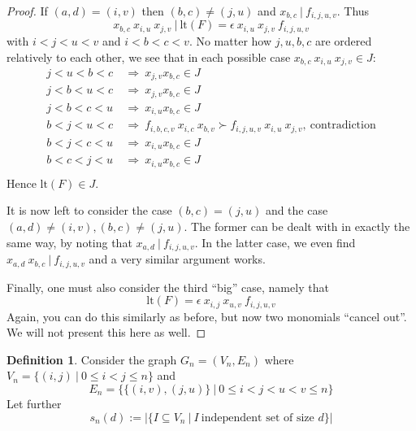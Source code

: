 \documentclass{scrartcl}
\newcommand{\contradiction}{\text{contradiction}}
\newcommand{\divides}{\ | \ }
\theoremstyle{definition}
\newtheorem{definition}[subsection]{Definition}
\begin{document}
\begin{proof}
    If $(a, d) = (i, v)$ then $(b, c) \neq (j, u)$ and $x_{b, c} \divides f_{i, j, u, v}$.
    Thus
    \begin{equation*}
        x_{b, c} \ x_{i, u} \ x_{j, v} \divides \mathrm{lt}(F) = \epsilon \ x_{i, u} \ x_{j, v} \ f_{i, j, u, v}
    \end{equation*}
    with $i < j < u < v$ and $i < b < c < v$. 
    No matter how $j, u, b, c$ are ordered relatively to each other, we see that in each possible case $x_{b, c} \ x_{i, u} \ x_{j, v} \in J$:
    \begin{align*}
        j < u < b < c \ &\Rightarrow \ x_{j, v} x_{b, c} \in J \\
        j < b < u < c \ &\Rightarrow \ x_{j, v} x_{b, c} \in J \\
        j < b < c < u \ &\Rightarrow \ x_{i, u} x_{b, c} \in J \\
        b < j < u < c \ &\Rightarrow \ f_{i, b, c, v} \ x_{i, c} \ x_{b, v} \succ f_{i, j, u, v} \ x_{i, u} \ x_{j, v}, \ \contradiction \\
        b < j < c < u \ &\Rightarrow \ x_{i, u} x_{b, c} \in J \\
        b < c < j < u \ &\Rightarrow \ x_{i, u} x_{b, c} \in J \\
    \end{align*}
    Hence $\mathrm{lt}(F) \in J$.

    It is now left to consider the case $(b, c) = (j, u)$ and the case $(a, d) \neq (i, v), (b, c) \neq (j, u)$.
    The former can be dealt with in exactly the same way, by noting that $x_{a, d} \divides f_{i, j, u, v}$.
    In the latter case, we even find $x_{a, d} \ x_{b, c} \divides f_{i, j, u, v}$ and a very similar argument works.

    Finally, one must also consider the third ``big'' case, namely that
    \begin{equation*}
        \mathrm{lt}(F) = \epsilon \ x_{i, j} \ x_{u, v} \ f_{i, j, u, v} 
    \end{equation*}
    Again, you can do this similarly as before, but now two monomials ``cancel out''.
    We will not present this here as well.
\end{proof}

\begin{definition}
    Consider the graph $G_n = (V_n, E_n)$ where $V_n = \{ (i, j) \ | \ 0 \leq i < j \leq n \}$ and
    \begin{equation*}
        E_n = \{ \{ (i, v), (j, u) \} \ | \ 0 \leq i < j < u < v \leq n \}
    \end{equation*}
    Let further
    \begin{equation*}
        s_n(d) := |\{ I \subseteq V_n \ | \ I \ \text{independent set of size $d$}\}|
    \end{equation*}
\end{definition}
\end{document}
